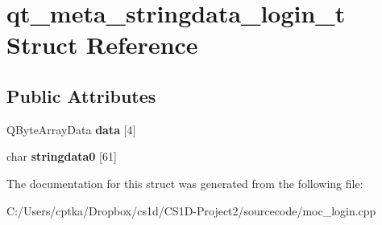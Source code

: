 \hypertarget{structqt__meta__stringdata__login__t}{}\section{qt\+\_\+meta\+\_\+stringdata\+\_\+login\+\_\+t Struct Reference}
\label{structqt__meta__stringdata__login__t}
\subsection*{Public Attributes}
\begin{DoxyCompactItemize}
\item 
\mbox{\label{structqt__meta__stringdata__login__t_aec1c613c8c6eb2f6abd03e9d885e54cd}} 
Q\+Byte\+Array\+Data {\bfseries data} \mbox{[}4\mbox{]}
\item 
\mbox{\label{structqt__meta__stringdata__login__t_ace62ca1d23735473b2204a298cf09c2e}} 
char {\bfseries stringdata0} \mbox{[}61\mbox{]}
\end{DoxyCompactItemize}


The documentation for this struct was generated from the following file\+:\begin{DoxyCompactItemize}
\item 
C\+:/\+Users/cptka/\+Dropbox/cs1d/\+C\+S1\+D-\/\+Project2/sourcecode/moc\+\_\+login.\+cpp\end{DoxyCompactItemize}

